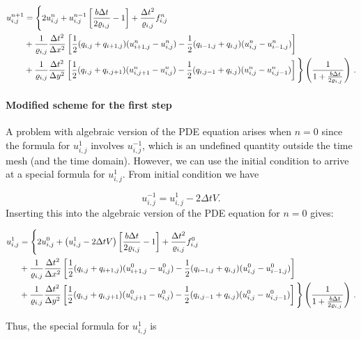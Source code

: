 \documentclass[letterpaper,10pt,english]{/usr/share/sphinx/texinputs/sphinxhowto}
\begin{document}
\begin{align*}u^{n+1}_{i,j} &= 
\Bigg\{
2u^{n}_{i,j} + u^{n-1}_{i,j}\left[\frac{b \Delta t}{2\varrho_{i,j}} - 1\right]+\frac{\Delta t^2}{\varrho_{i,j}} f^n_{i,j} \\
&+ \frac{1}{\varrho_{i,j}}\frac{\Delta t^2}{\Delta x^2} 
\left[ \frac{1}{2}(q_{i,j} + q_{i+1,j})(u^{n}_{i+1,j} - u^{n}_{i,j}) - \frac{1}{2}(q_{i-1,j} + q_{i,j})(u^{n}_{i,j} - u^{n}_{i-1,j})\right] \\
&+ \frac{1}{\varrho_{i,j}}\frac{\Delta t^2}{\Delta y^2} 
\left[ \frac{1}{2}(q_{i,j} + q_{i,j+1})(u^{n}_{i,j+1} - u^{n}_{i,j}) -\frac{1}{2}(q_{i,j-1} + q_{i,j})(u^{n}_{i,j} - u^{n}_{i,j-1})\right]
\Bigg\} \left(\frac{1}{1+ \frac{b\Delta t}{2\varrho_{i,j} }}\right )
\thinspace .\end{align*}\paragraph{Modified scheme for the first step}

A problem with algebraic version of the PDE equation arises when $n=0$
since the formula for $u^1_{i,j}$ involves $u^{-1}_{i,j}$, which is an
undefined quantity outside the time mesh (and the time domain). However,
we can use the initial condition to arrive at a special formula for
$u^1_{i,j}$. From initial condition we have

\[
 u^{-1}_{i,j} =u^1_{i,j} -  2\Delta tV.
\] Inserting this into the algebraic version of the PDE equation for
$n=0$ gives:

\begin{align*}u^{1}_{i,j} &= 
\Bigg\{
2u^{0}_{i,j} + \left( u^1_{i,j} -  2\Delta tV\right)\left[\frac{b \Delta t}{2\varrho_{i,j}} - 1\right]+\frac{\Delta t^2}{\varrho_{i,j}} f^0_{i,j} \\
&+ \frac{1}{\varrho_{i,j}}\frac{\Delta t^2}{\Delta x^2} 
\left[ \frac{1}{2}(q_{i,j} + q_{i+1,j})(u^{0}_{i+1,j} - u^{0}_{i,j}) - \frac{1}{2}(q_{i-1,j} + q_{i,j})(u^{0}_{i,j} - u^{0}_{i-1,j})\right] \\
&+ \frac{1}{\varrho_{i,j}}\frac{\Delta t^2}{\Delta y^2} 
\left[ \frac{1}{2}(q_{i,j} + q_{i,j+1})(u^{0}_{i,j+1} - u^{0}_{i,j}) -\frac{1}{2}(q_{i,j-1} + q_{i,j})(u^{0}_{i,j} - u^{0}_{i,j-1})\right]
\Bigg\} \left(\frac{1}{1+ \frac{b\Delta t}{2\varrho_{i,j} }}\right )
\thinspace .\end{align*}

Thus, the special formula for $u^1_{i,j}$ is
\end{document}
